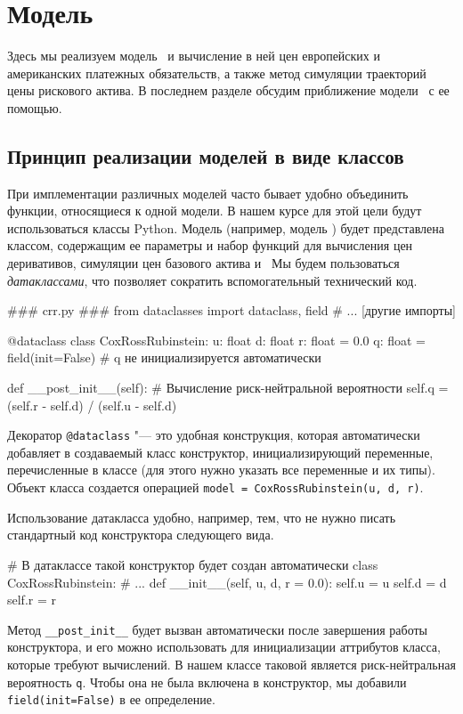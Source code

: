 \chapter{Модель \crr}
\label{ch:pr-crr}
\chaptertoc

Здесь мы реализуем модель \crr\ и вычисление в ней цен европейских и американских платежных обязательств, а также метод симуляции траекторий цены рискового актива.
В последнем разделе обсудим приближение модели \bs\ с ее помощью.

\section{Принцип реализации моделей в виде классов}
При имплементации различных моделей часто бывает удобно объединить функции, относящиеся к одной модели.
В нашем курсе для этой цели будут использоваться классы Python. 
Модель (например, модель \crr) будет представлена классом, содержащим ее параметры и набор функций для вычисления цен деривативов, симуляции цен базового актива и \td\ 
Мы будем пользоваться \emph{датаклассами}, что позволяет сократить вспомогательный технический код.
\begin{python}
### crr.py ###
from dataclasses import dataclass, field
# ... [другие импорты]

@dataclass
class CoxRossRubinstein:
    u: float
    d: float
    r: float = 0.0
    q: float = field(init=False)   # q не инициализируется автоматически

    def __post_init__(self):
        # Вычисление риск-нейтральной вероятности
        self.q = (self.r - self.d) / (self.u - self.d)        
\end{python}

Декоратор \verb"@dataclass" "--- это удобная конструкция, которая автоматически добавляет в создаваемый класс конструктор, инициализирующий переменные, перечисленные в классе (для этого нужно указать все переменные и их типы).
Объект класса создается операцией \verb"model = CoxRossRubinstein(u, d, r)".  

Использование датакласса удобно, например, тем, что не нужно писать стандартный код конструктора следующего вида.
\begin{python}
# В датаклассе такой конструктор будет создан автоматически
class CoxRossRubinstein:
    # ...
    def __init__(self, u, d, r = 0.0):
      self.u = u
      self.d = d
      self.r = r
\end{python}

Метод \verb"__post_init__" будет вызван автоматически после завершения работы конструктора, и его можно использовать для инициализации аттрибутов класса, которые требуют вычислений.
В нашем классе таковой является риск-нейтральная вероятность \verb"q".
Чтобы она не была включена в конструктор, мы добавили \verb"field(init=False)" в ее определение.

